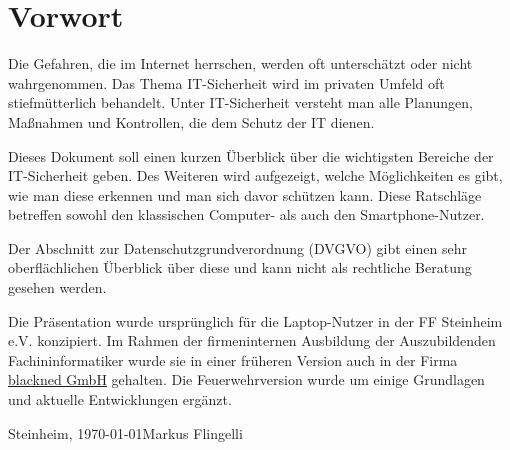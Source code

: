 \section*{Vorwort}
Die Gefahren, die im Internet herrschen, werden oft unterschätzt oder nicht wahrgenommen. Das Thema IT-Sicherheit wird im privaten Umfeld oft stiefmütterlich behandelt. Unter IT-Sicher\-heit versteht man alle Planungen, Maßnahmen und Kontrollen, die dem Schutz der IT dienen.
\vspace{12pt}

Dieses Dokument soll einen kurzen Überblick über die wichtigsten Bereiche der IT-Sicherheit geben.  Des Weiteren wird aufgezeigt, welche Möglichkeiten es gibt, wie man diese erkennen und man sich davor schützen kann. Diese Ratschläge betreffen sowohl den klassischen Com\-puter- als auch den Smartphone-Nutzer.
\vspace{12pt}

Der Abschnitt zur Datenschutzgrundverordnung (DVGVO) gibt einen sehr oberflächlichen Überblick über diese und kann nicht als rechtliche Beratung gesehen werden.
\vspace{12pt}

Die Präsentation wurde ursprünglich für die Laptop-Nutzer in der FF Steinheim e.V. konzipiert. Im Rahmen der firmeninternen Ausbildung der Auszubildenden Fachininformatiker wurde sie in einer früheren Version auch in der Firma \href{https://www.blackned.de}{blackned GmbH} gehalten. Die Feuerwehrversion wurde um einige Grundlagen und aktuelle Entwicklungen ergänzt.
\vspace{24pt}

Steinheim, \today \hfill Markus Flingelli
\newpage
